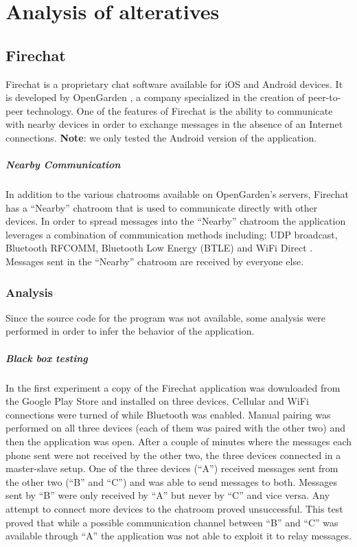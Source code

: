 \chapter{Analysis of alteratives}
\section{Firechat}
Firechat is a proprietary chat software available for iOS and Android devices.
It is developed by OpenGarden \cite{opengarden}, a company specialized in the creation of peer-to-peer technology.
One of the features of Firechat is the ability to communicate with nearby devices in order to exchange messages in the absence of an Internet connections.
\textbf{Note}: we only tested the Android version of the application.

\paragraph{Nearby Communication} In addition to the various chatrooms available on OpenGarden's servers, Firechat has a ``Nearby'' chatroom that is used to communicate directly with other devices.
In order to spread messages into the ``Nearby'' chatroom the application leverages a combination of communication methods including: UDP broadcast, Bluetooth RFCOMM, Bluetooth Low Energy (BTLE) \cite{btle} and WiFi Direct \cite{wifi-direct}.
Messages sent in the ``Nearby'' chatroom are received by everyone else.

\subsection{Analysis}
Since the source code for the program was not available, some analysis were performed in order to infer the behavior of the application.

\paragraph{Black box testing}
In the first experiment a copy of the Firechat application was downloaded from the Google Play Store \cite{google-play-store} and installed on three devices.
Cellular and WiFi connections were turned of while Bluetooth was enabled.
Manual pairing was performed on all three devices (each of them was paired with the other two) and then the application was open.
After a couple of minutes where the messages each phone sent were not received by the other two, the three devices connected in a master-slave setup.
One of the three devices (``A'') received messages sent from the other two (``B'' and ``C'') and was able to send messages to both.
Messages sent by ``B'' were only received by ``A'' but never by ``C'' and vice versa.
Any attempt to connect more devices to the chatroom proved unsuccessful.
This test proved that while a possible communication channel between ``B'' and ``C'' was available through ``A'' the application was not able to exploit it to relay messages.


